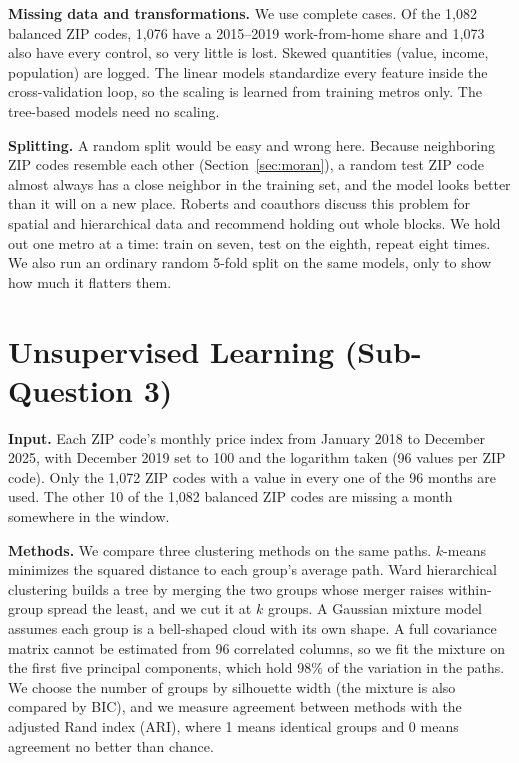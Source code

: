 \documentclass[11pt]{article}
\begin{document}
\textbf{Missing data and transformations.} We use complete cases. Of the 1,082 balanced ZIP codes, 1,076 have a 2015--2019 work-from-home share and 1,073 also have every
control, so very little is lost. Skewed quantities (value, income, population) are logged.
The linear models standardize every feature inside the cross-validation loop, so the scaling is learned from training metros only.
The tree-based models need no scaling.

\textbf{Splitting.} A random split would be easy and wrong here. Because neighboring ZIP codes resemble each other
(Section~\ref{sec:moran}), a random test ZIP code almost always has a close neighbor in the training set, and the model looks
better than it will on a new place. Roberts and coauthors \cite{roberts} discuss this problem for spatial and hierarchical data
and recommend holding out whole blocks. We hold out one metro at a time: train on seven, test on the eighth, repeat eight times. We
also run an ordinary random 5-fold split on the same models, only to show how much it flatters them.

\section{Unsupervised Learning (Sub-Question 3)}
\label{sec:cluster}

\textbf{Input.} Each ZIP code's monthly price index from January 2018 to December 2025, with December 2019 set to 100 and the
logarithm taken (96 values per ZIP code). Only the 1,072 ZIP codes with a value in every one of the 96 months are used. The other 10 of the 1,082
balanced ZIP codes are missing a month somewhere in the window.

\textbf{Methods.} We compare three clustering methods on the same paths. $k$-means minimizes the squared distance to each group's
average path. Ward hierarchical clustering builds a tree by merging the two groups whose merger raises within-group spread the
least, and we cut it at $k$ groups. A Gaussian mixture model assumes each group is a bell-shaped cloud with its own shape. A full
covariance matrix cannot be estimated from 96 correlated columns, so we fit the mixture on the first five principal components,
which hold 98\% of the variation in the paths. We choose the number of groups by silhouette width \cite{rousseeuw} (the
mixture is also compared by BIC), and we measure agreement between methods with the adjusted Rand index (ARI), where 1 means
identical groups and 0 means agreement no better than chance.
\end{document}
